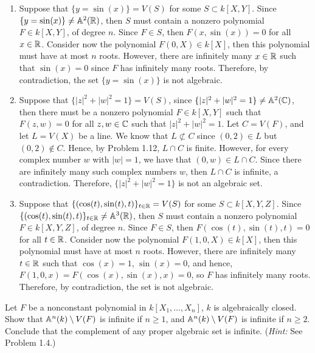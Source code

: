 \begin{solution}
    \begin{enumerate}[label=(\alph*)]
        \item Suppose that $\{y = \sin(x)\} = V(S)$ for some $S \subset k[X,Y]$. Since $\{y = \sin(x)\} \neq \mathbb{A}^2(\mathbb{R})$, then $S$ must contain a nonzero polynomial $F \in k[X,Y]$, of degree $n$. Since $F \in S$, then $F(x, \sin(x)) =0$ for all $x \in \mathbb{R}$. Consider now the polynomial $F(0,X) \in k[X]$, then this polynomial must have at most $n$ roots. However, there are infinitely many $x \in \mathbb{R}$ such that $\sin(x) = 0$ since $F$ has infinitely many roots. Therefore, by contradiction, the set $\{y = \sin(x)\}$ is not algebraic.
        \item Suppose that $\{|z|^2 + |w|^2 = 1\} = V(S)$, since $\{|z|^2 + |w|^2 = 1\} \neq \mathbb{A}^2(\mathbb{C})$, then there must be a nonzero polynomial $F \in k[X,Y]$ such that $F(z,w) = 0$ for all $z,w \in \mathbb{C}$ such that $|z|^2 + |w|^2 = 1$. Let $C = V(F)$, and let $L = V(X)$ be a line. We know that $L \not\subset C$ since $(0,2) \in L$ but $(0,2) \not\in C$. Hence, by Problem 1.12, $L\cap C$ is finite. However, for every complex number $w$ with $|w| = 1$, we have that $(0,w) \in L \cap C$. Since there are infinitely many such complex numbers $w$, then $L \cap C$ is infinite, a contradiction. Therefore, $\{|z|^2 + |w|^2 = 1\}$ is not an algebraic set.
        \item Suppose that $\{(\cos(t), \sin(t), t)\}_{t\in\mathbb{R}} = V(S)$ for some $S \subset k[X,Y, Z]$. Since $\{(\cos(t), \sin(t), t)\}_{t\in\mathbb{R}} \neq \mathbb{A}^3(\mathbb{R})$, then $S$ must contain a nonzero polynomial $F \in k[X,Y,Z]$, of degree $n$. Since $F \in S$, then $F(\cos(t), \sin(t), t) =0$ for all $t \in \mathbb{R}$. Consider now the polynomial $F(1, 0, X) \in k[X]$, then this polynomial must have at most $n$ roots. However, there are infinitely many $t \in \mathbb{R}$ such that $\cos(x) = 1$, $\sin(x) = 0$, and hence, $F(1,0,x) = F(\cos(x), \sin(x), x) = 0$, so $F$ has infinitely many roots. Therefore, by contradiction, the set is not algebraic. \\
    \end{enumerate}
\end{solution}

\begin{exercise}
    Let $F$ be a nonconstant polynomial in $k[X_1, \dots, X_n]$, $k$ is algebraically closed. Show that $\mathbb{A}^n(k) \setminus V(F)$ is infinite if $n \geq 1$, and $\mathbb{A}^n(k) \setminus V(F)$ is infinite if $n \geq 2$. Conclude that the complement of any proper algebraic set is infinite. (\textit{Hint:} See Problem 1.4.)  \\
\end{exercise}

